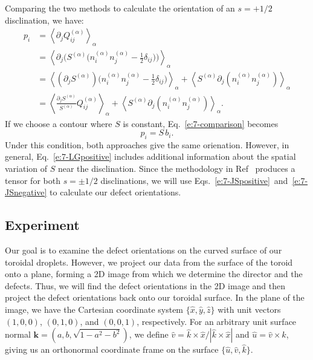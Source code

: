 Comparing the two methods to calculate the orientation of an $s = +1/2$ disclination, we have:
\begin{align}
 p_i &= \left \langle \partial_j Q_{ij}^{(\alpha)} \right \rangle_{\alpha} \nonumber \\
  &= \left \langle \partial_j \bigg(S^{(\alpha)}\bigg(n_{i}^{(\alpha)}n_{j}^{(\alpha)} - \frac{1}{2}\delta_{ij}\bigg)\bigg) \right \rangle_{\alpha} \nonumber \\
  &= \left \langle (\partial_j S^{(\alpha)}) \bigg(n_{i}^{(\alpha)}n_{j}^{(\alpha)} - \frac{1}{2}\delta_{ij}\bigg) \right \rangle_{\alpha}
      + \left \langle S^{(\alpha)} \partial_j (n_{i}^{(\alpha)}n_{j}^{(\alpha)}) \right \rangle_{\alpha} \nonumber \\
  &= \left \langle \frac{\partial_j S^{(\alpha)}}{S^{(\alpha)}} Q_{ij}^{(\alpha)}\right \rangle_{\alpha}
      + \left \langle S^{(\alpha)} \partial_j (n_{i}^{(\alpha)}n_{j}^{(\alpha)}) \right \rangle_{\alpha}\label{e:7-comparison}.
\end{align}
If we choose a contour where $S$ is constant, Eq.~\ref{e:7-comparison} becomes
\begin{equation}
  p_i = S \, b_i.
\end{equation}
Under this condition, both approaches give the same orienation.
However, in general, Eq.~\ref{e:7-LGpositive} includes additional information about the spatial variation of $S$ near the disclination.
Since the methodology in Ref~\cite{jsel} produces a tensor for both $s = \pm 1/2$ disclinations, we will use Eqs.~\ref{e:7-JSpositive}~and~\ref{e:7-JSnegative} to calculate our defect orientations.


\subsection{Experiment}
Our goal is to examine the defect orientations on the curved surface of our toroidal droplets.
However, we project our data from the surface of the toroid onto a plane, forming a 2D image from which we determine the director and the defects.
Thus, we will find the defect orientations in the 2D image and then project the defect orientations back onto our toroidal surface.
In the plane of the image, we have the Cartesian coordinate system $\{ \hat{x},\hat{y},\hat{z} \}$ with unit vectors $(1,0,0)$, $(0,1,0)$, and $(0,0,1)$, respectively.
For an arbitrary unit surface normal $\mathbf{k} = (a, b, \sqrt{1-a^2-b^2})$, we define $\hat{v} = \hat{k} \times \hat{x}/|\hat{k} \times \hat{x}|$ and $\hat{u} = \hat{v} \times \hat{k}$, giving us an orthonormal coordinate frame on the surface $\{\hat{u},\hat{v},\hat{k} \}$.


